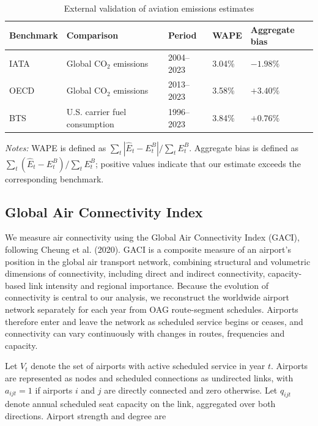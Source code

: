 \documentclass[12pt]{extarticle}
\begin{document}
\begin{table}[htbp]
\centering
\caption{External validation of aviation emissions estimates}
\label{tab:validation_benchmarks}
\small
\begin{tabular}{lllll}
\hline
Benchmark & Comparison & Period & WAPE & Aggregate bias \\
\hline
IATA & Global CO$_2$ emissions & 2004--2023 & 3.04\% & $-1.98\%$ \\
OECD & Global CO$_2$ emissions & 2013--2023 & 3.58\% & $+3.40\%$ \\
BTS & U.S. carrier fuel consumption & 1996--2023 & 3.84\% & $+0.76\%$ \\
\hline
\end{tabular}

\vspace{0.4em}
\begin{minipage}{0.96\linewidth}
\footnotesize\textit{Notes:} WAPE is defined as $\sum_t |\widehat{E}_t-E_t^B|/\sum_t E_t^B$. Aggregate bias is defined as $\sum_t(\widehat{E}_t-E_t^B)/\sum_t E_t^B$; positive values indicate that our estimate exceeds the corresponding benchmark.
\end{minipage}
\end{table}

\subsection*{Global Air Connectivity Index}

We measure air connectivity using the Global Air Connectivity Index (GACI), following Cheung et al. (2020). GACI is a composite measure of an airport's position in the global air transport network, combining structural and volumetric dimensions of connectivity, including direct and indirect connectivity, capacity-based link intensity and regional importance. Because the evolution of connectivity is central to our analysis, we reconstruct the worldwide airport network separately for each year from OAG route-segment schedules. Airports therefore enter and leave the network as scheduled service begins or ceases, and connectivity can vary continuously with changes in routes, frequencies and capacity.

Let $V_t$ denote the set of airports with active scheduled service in year $t$. Airports are represented as nodes and scheduled connections as undirected links, with $a_{ijt}=1$ if airports $i$ and $j$ are directly connected and zero otherwise. Let $q_{ijt}$ denote annual scheduled seat capacity on the link, aggregated over both directions. Airport strength and degree are
\end{document}
